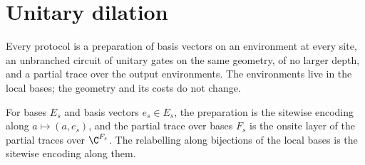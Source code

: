 \section{Unitary dilation}
\label{sec:protocols_dilation}

Every protocol is a preparation of basis vectors on an environment at every site, an
unbranched circuit of unitary gates on the same geometry, of no larger depth, and a partial
trace over the output environments. The environments live in the local bases; the geometry and
its costs do not change.

\begin{definition}
    \label{def:protocols_dilation_circuits}
    \leanok
    For bases $E_s$ and basis vectors $e_s\in E_s$, the preparation is the sitewise encoding
    along $a\mapsto(a,e_s)$, and the partial trace over bases $F_s$ is the onsite layer of the
    partial traces over $\C^{F_s}$. The relabelling along bijections of the local bases is the
    sitewise encoding along them.
\end{definition}

